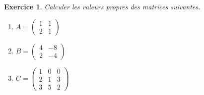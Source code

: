 \documentclass[12pt]{article}
\newtheorem{exercice}{\bf Exercice}
\newenvironment{exo}{
\begin{exercice}\smallskip\normalfont}{\end{exercice}
}
\newif\ifcorrige\corrigetrue
\begin{document}
\begin{exo}
  Calculer les valeurs propres des matrices suivantes.
  \begin{multicols}{3}
    \begin{enumerate}
    \item
      $A=\begin{pmatrix}
        1 & 1
        \\
        2 & 1
      \end{pmatrix}$

    \item 
      $B=\begin{pmatrix}
        4 & -8
        \\
        2 & -4
      \end{pmatrix}$
    \item 
      $C=\begin{pmatrix}
        1 & 0 & 0
        \\
        2 & 1 & 3
        \\
        3 & 5 & 2
      \end{pmatrix}$
    \end{enumerate}
  \end{multicols}
\end{exo}
\ifcorrige
\color{magenta}
\end{document}
